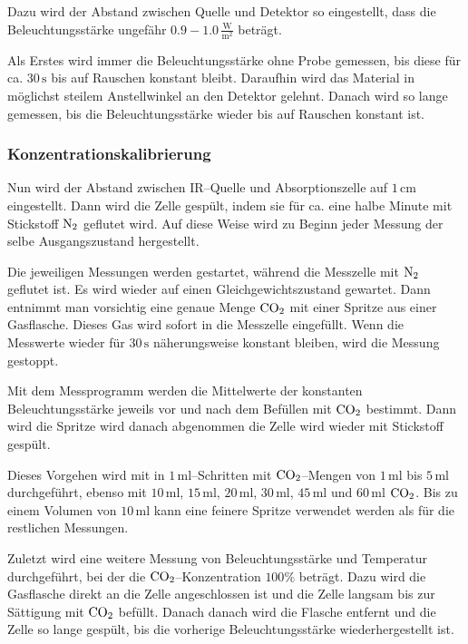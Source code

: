 \documentclass[12pt,a4paper]{scrartcl}
\numberwithin{equation}{section} %
\begin{document}
Dazu wird der Abstand zwischen Quelle und Detektor so eingestellt, dass die Beleuchtungsstärke ungefähr $0.9-1.0\mathrm{\,\frac{W}{m^2}}$ beträgt.

Als Erstes wird immer die Beleuchtungsstärke ohne Probe gemessen, bis diese für ca. $30\mathrm{\,s}$ bis auf Rauschen konstant bleibt. Daraufhin wird das Material in möglichst steilem Anstellwinkel an den Detektor gelehnt. Danach wird so lange gemessen, bis die Beleuchtungsstärke wieder bis auf Rauschen konstant ist.

\subsubsection{Konzentrationskalibrierung}
\label{Konzentrationskalibrierung}
Nun wird der Abstand zwischen IR--Quelle und Absorptionszelle auf $1\mathrm{\,cm}$ eingestellt. Dann wird die Zelle gespült, indem sie für ca. eine halbe Minute mit Stickstoff $\ce{N_2}$ geflutet wird. Auf diese Weise wird zu Beginn jeder Messung der selbe Ausgangszustand hergestellt.

Die jeweiligen Messungen werden gestartet, während die Messzelle mit $\ce{N_2}$ geflutet ist. Es wird wieder auf einen Gleichgewichtszustand gewartet. Dann entnimmt man vorsichtig eine genaue Menge $\ce{CO_2}$ mit einer Spritze aus einer Gasflasche. Dieses Gas wird sofort in die Messzelle eingefüllt. Wenn die Messwerte wieder für $30\mathrm{\,s}$ näherungsweise konstant bleiben, wird die Messung gestoppt.

Mit dem Messprogramm werden die Mittelwerte der konstanten Beleuchtungsstärke jeweils vor und nach dem Befüllen mit $\ce{CO_2}$ bestimmt. Dann wird die Spritze wird danach abgenommen die Zelle wird wieder mit Stickstoff gespült.

Dieses Vorgehen wird mit in $1\mathrm{\,ml}$--Schritten mit $\ce{CO_2}$--Mengen von $1\mathrm{\,ml}$ bis $5\mathrm{\,ml}$ durchgeführt, ebenso mit $10\mathrm{\,ml}$, $15\mathrm{\,ml}$, $20\mathrm{\,ml}$, $30\mathrm{\,ml}$, $45\mathrm{\,ml}$ und $60\mathrm{\,ml}$ $\ce{CO_2}$. Bis zu einem Volumen von $10\mathrm{\,ml}$ kann eine feinere Spritze verwendet werden als für die restlichen Messungen.

Zuletzt wird eine weitere Messung von Beleuchtungsstärke und Temperatur durchgeführt, bei der die $\ce{CO_2}$--Konzentration $100\%$ beträgt. Dazu wird die  Gasflasche direkt an die Zelle angeschlossen ist und die Zelle langsam bis zur Sättigung mit $\ce{CO_2}$ befüllt. Danach danach wird die Flasche entfernt und die Zelle so lange gespült, bis die vorherige Beleuchtungsstärke wiederhergestellt ist.
\end{document}

